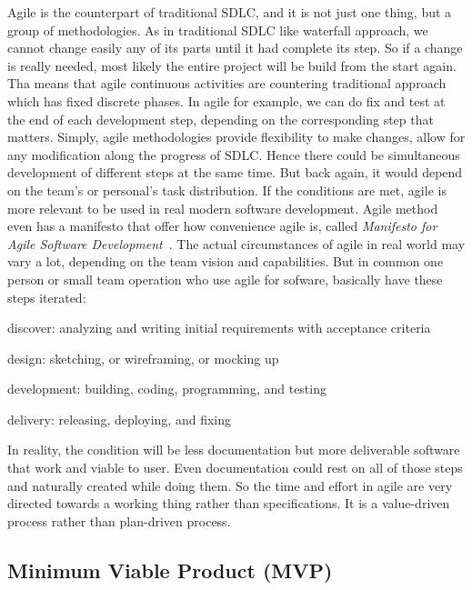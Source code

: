 Agile is the counterpart of traditional \ac{SDLC}, and it is not just one thing, but a group of methodologies.
As in traditional \ac{SDLC} like waterfall approach, we cannot change easily any of its parts until it had complete its step.
So if a change is really needed, most likely the entire project will be build from the start again.
Tha means that agile continuous activities are countering traditional approach which has fixed discrete phases.
In agile for example, we can do fix and test at the end of each development step, depending on the corresponding step that matters.
Simply, agile methodologies provide flexibility to make changes, allow for any modification along the progress of \ac{SDLC}.
Hence there could be simultaneous development of different steps at the same time.
But back again, it would depend on the team's or personal's task distribution.
If the conditions are met, agile is more relevant to be used in real modern software development.
Agile method even has a manifesto that offer how convenience agile is, called \textit{Manifesto for Agile Software Development}~\autocite{Beck2001Manifesto}.
The actual circumstances of agile in real world may vary a lot, depending on the team vision and capabilities.
But in common one person or small team operation who use agile for sofware, basically have these steps iterated:
\begin{inparaenum}
\item discover: analyzing and writing initial requirements with acceptance criteria
\item design: sketching, or wireframing, or mocking up
\item development: building, coding, programming, and testing
\item delivery: releasing, deploying, and fixing
\end{inparaenum}
In reality, the condition will be less documentation but more deliverable software that work and viable to user.
Even documentation could rest on all of those steps and naturally created while doing them.
So the time and effort in agile are very directed towards a working thing rather than specifications.
It is a value-driven process rather than plan-driven process.

\subsection{Minimum Viable Product (MVP)}

